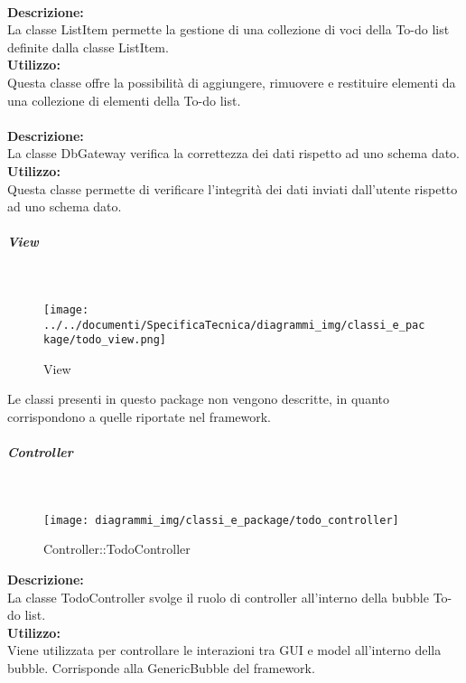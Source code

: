 \label{todo-container}\mbox{}\\
\textbf{Descrizione:}\\
La classe List\-Item permette la gestione di una collezione di voci della To-do list definite dalla classe List\-Item.\\
\textbf{Utilizzo:}\\
Questa classe offre la possibilità di aggiungere, rimuovere e restituire elementi da una collezione di elementi della To-do list.\\


\label{todo-gateway}\mbox{}\\
\textbf{Descrizione:}\\
La classe Db\-Gateway verifica la correttezza dei dati rispetto ad uno schema dato.\\
\textbf{Utilizzo:}\\
Questa classe permette di verificare l'integrità dei dati inviati dall'utente rispetto ad uno schema dato.

\begin{samepage}
	\subparagraph{View}\mbox{}\\
	\nopagebreak
	\begin{figure}[H]
		\centering
		\texttt{[image: ../../documenti/SpecificaTecnica/diagrammi\_img/classi\_e\_package/todo\_view.png]}
		\caption{View}
	\end{figure}
\end{samepage}
Le classi presenti in questo package non vengono descritte, in quanto corrispondono a quelle riportate nel framework.

\subparagraph{Controller}\mbox{}
\begin{samepage}
	\label{todo-controller}\mbox{}\\
	\nopagebreak
	\begin{figure}[H]
		\centering
		\texttt{[image: diagrammi\_img/classi\_e\_package/todo\_controller]}
		\caption{Controller\-::Todo\-Controller}
	\end{figure}
\end{samepage}
\textbf{Descrizione:}\\
La classe TodoController svolge il ruolo di controller all'interno della bubble To-do list. \\
\textbf{Utilizzo:}\\
Viene utilizzata per controllare le interazioni tra GUI e model all'interno della bubble. Corrisponde alla GenericBubble del framework. \\